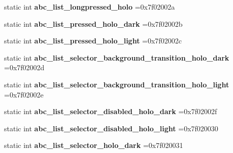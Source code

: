 \begin{DoxyCompactItemize}
static int {\bfseries abc\+\_\+list\+\_\+longpressed\+\_\+holo} =0x7f02002a
\item 
\mbox{\label{classandroid_1_1support_1_1graphics_1_1drawable_1_1R_1_1drawable_a73ea98c382bfa3dc96c44fcd6ca0fae8}} 
static int {\bfseries abc\+\_\+list\+\_\+pressed\+\_\+holo\+\_\+dark} =0x7f02002b
\item 
\mbox{\label{classandroid_1_1support_1_1graphics_1_1drawable_1_1R_1_1drawable_a86e4e70dace4d15c36fdc246f623a36d}} 
static int {\bfseries abc\+\_\+list\+\_\+pressed\+\_\+holo\+\_\+light} =0x7f02002c
\item 
\mbox{\label{classandroid_1_1support_1_1graphics_1_1drawable_1_1R_1_1drawable_a891cc002824d5f94eef558d7dfae6043}} 
static int {\bfseries abc\+\_\+list\+\_\+selector\+\_\+background\+\_\+transition\+\_\+holo\+\_\+dark} =0x7f02002d
\item 
\mbox{\label{classandroid_1_1support_1_1graphics_1_1drawable_1_1R_1_1drawable_aba7298aee1541fff5e04477d66b1e55c}} 
static int {\bfseries abc\+\_\+list\+\_\+selector\+\_\+background\+\_\+transition\+\_\+holo\+\_\+light} =0x7f02002e
\item 
\mbox{\label{classandroid_1_1support_1_1graphics_1_1drawable_1_1R_1_1drawable_a1619808ae2fd8f2cd2c9f924e896f7ef}} 
static int {\bfseries abc\+\_\+list\+\_\+selector\+\_\+disabled\+\_\+holo\+\_\+dark} =0x7f02002f
\item 
\mbox{\label{classandroid_1_1support_1_1graphics_1_1drawable_1_1R_1_1drawable_a43cefd1b937f27cfebeafab5c8ccb72e}} 
static int {\bfseries abc\+\_\+list\+\_\+selector\+\_\+disabled\+\_\+holo\+\_\+light} =0x7f020030
\item 
\mbox{\label{classandroid_1_1support_1_1graphics_1_1drawable_1_1R_1_1drawable_a8609dc09106c83039b4d0b9c0f361a1b}} 
static int {\bfseries abc\+\_\+list\+\_\+selector\+\_\+holo\+\_\+dark} =0x7f020031

\end{DoxyCompactItemize}
